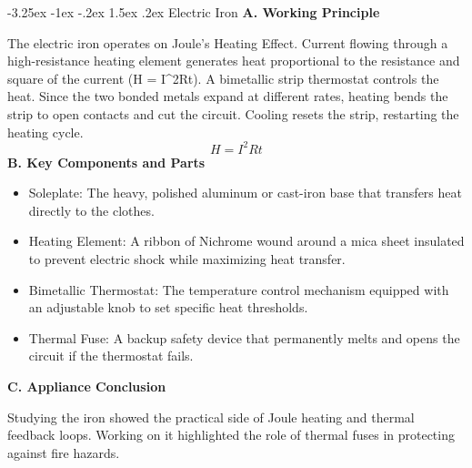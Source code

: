 \documentclass[11pt,a4paper]{report}
\makeatletter
\renewcommand{\section}{\@startsection{section}{1}{\z@}%
  {-3.25ex \@plus -1ex \@minus -.2ex}%
  {1.5ex \@plus.2ex}%
  {\normalfont\Large\bfseries\color{primaryColor}}}
\makeatother
\begin{document}
\section{Electric Iron}
\noindent\textbf{A. Working Principle}\par\medskip
The electric iron operates on Joule's Heating Effect. Current flowing through a high-resistance heating element generates heat proportional to the resistance and square of the current (H = I\textasciicircum{}2Rt). A bimetallic strip thermostat controls the heat. Since the two bonded metals expand at different rates, heating bends the strip to open contacts and cut the circuit. Cooling resets the strip, restarting the heating cycle.
\begin{equation}H = I^2 R t\end{equation}
\noindent\textbf{B. Key Components and Parts}\par\medskip
\begin{itemize}
  \item Soleplate: The heavy, polished aluminum or cast-iron base that transfers heat directly to the clothes.
  \item Heating Element: A ribbon of Nichrome wound around a mica sheet insulated to prevent electric shock while maximizing heat transfer.
  \item Bimetallic Thermostat: The temperature control mechanism equipped with an adjustable knob to set specific heat thresholds.
  \item Thermal Fuse: A backup safety device that permanently melts and opens the circuit if the thermostat fails.
\end{itemize}
\noindent\textbf{C. Appliance Conclusion}\par\medskip
Studying the iron showed the practical side of Joule heating and thermal feedback loops. Working on it highlighted the role of thermal fuses in protecting against fire hazards.
\end{document}
